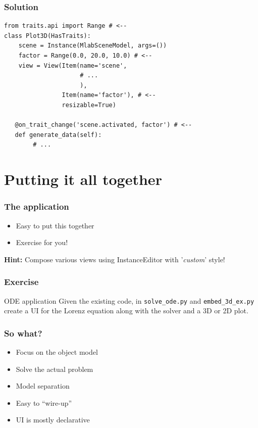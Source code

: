 \documentclass[14pt,compress]{beamer}
\newcommand{\typ}[1]{\lstinline{#1}}
\begin{document}
\begin{frame}
\frametitle{Solution}
\footnotesize
\begin{lstlisting}
from traits.api import Range # <--
class Plot3D(HasTraits):
    scene = Instance(MlabSceneModel, args=())
    factor = Range(0.0, 20.0, 10.0) # <--
    view = View(Item(name='scene', 
                     # ...
                     ),
                Item(name='factor'), # <--
                resizable=True)

   @on_trait_change('scene.activated, factor') # <--
   def generate_data(self):
        # ...
\end{lstlisting}
\end{frame}

\section{Putting it all together}

\begin{frame}
  \frametitle{The application}
  \begin{itemize}
      \item Easy to put this together
      \item Exercise for you!
 \end{itemize}
\vspace{0.5in}
{\footnotesize \textbf{Hint:} Compose various views using InstanceEditor with '\emph{custom}' style!}
\end{frame}

\begin{frame}[plain]
    \frametitle{Exercise}
\normalsize
  \begin{block}{ODE application}
  Given the existing code, in \typ{solve_ode.py} and \typ{embed_3d_ex.py}
  create a UI for the Lorenz equation along with the solver and a 3D or 2D plot.
  \end{block}
\end{frame}


\begin{frame}
  \frametitle{So what?}
  \begin{itemize}
      \item Focus on the object model
      \item Solve the actual problem
      \item Model separation
      \item Easy to ``wire-up''
      \item UI is mostly declarative
 \end{itemize}
\end{frame}
\end{document}
